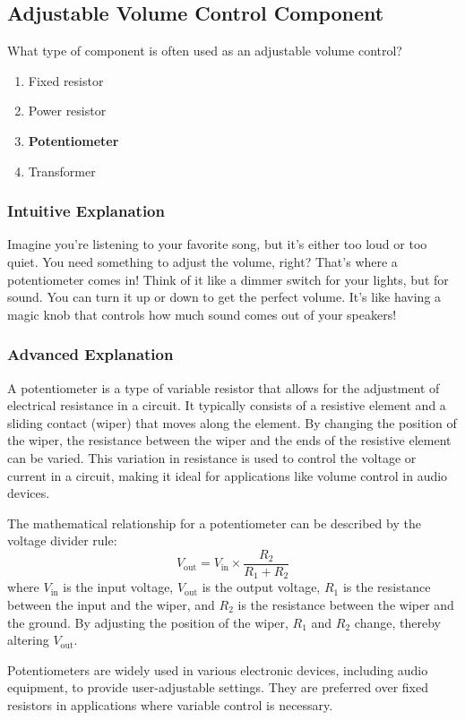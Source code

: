 \subsection{Adjustable Volume Control Component}
\label{T6A02}

\begin{tcolorbox}[colback=gray!10!white,colframe=black!75!black,title=T6A02]
What type of component is often used as an adjustable volume control?
\begin{enumerate}[label=\Alph*)]
    \item Fixed resistor
    \item Power resistor
    \item \textbf{Potentiometer}
    \item Transformer
\end{enumerate}
\end{tcolorbox}

\subsubsection{Intuitive Explanation}
Imagine you're listening to your favorite song, but it's either too loud or too quiet. You need something to adjust the volume, right? That's where a potentiometer comes in! Think of it like a dimmer switch for your lights, but for sound. You can turn it up or down to get the perfect volume. It's like having a magic knob that controls how much sound comes out of your speakers!

\subsubsection{Advanced Explanation}
A potentiometer is a type of variable resistor that allows for the adjustment of electrical resistance in a circuit. It typically consists of a resistive element and a sliding contact (wiper) that moves along the element. By changing the position of the wiper, the resistance between the wiper and the ends of the resistive element can be varied. This variation in resistance is used to control the voltage or current in a circuit, making it ideal for applications like volume control in audio devices.

The mathematical relationship for a potentiometer can be described by the voltage divider rule:
\[
V_{\text{out}} = V_{\text{in}} \times \frac{R_2}{R_1 + R_2}
\]
where \( V_{\text{in}} \) is the input voltage, \( V_{\text{out}} \) is the output voltage, \( R_1 \) is the resistance between the input and the wiper, and \( R_2 \) is the resistance between the wiper and the ground. By adjusting the position of the wiper, \( R_1 \) and \( R_2 \) change, thereby altering \( V_{\text{out}} \).

Potentiometers are widely used in various electronic devices, including audio equipment, to provide user-adjustable settings. They are preferred over fixed resistors in applications where variable control is necessary.

